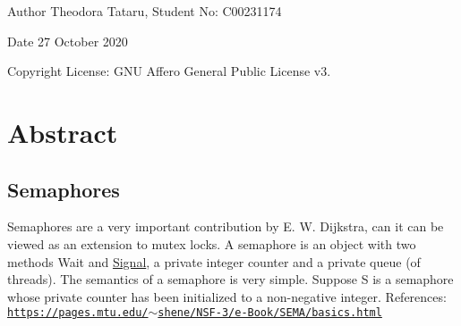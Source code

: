 \begin{DoxyAuthor}{Author}
Theodora Tataru, Student No\+: C00231174~\newline
 
\end{DoxyAuthor}
\begin{DoxyDate}{Date}
27 October 2020 
\end{DoxyDate}
\begin{DoxyCopyright}{Copyright}
License\+: G\+NU Affero General Public License v3. 
\end{DoxyCopyright}
\hypertarget{index_Abstract}{}\section{Abstract}\label{index_Abstract}
\hypertarget{index_Semaphores}{}\subsection{Semaphores}\label{index_Semaphores}
Semaphores are a very important contribution by E. W. Dijkstra, can it can be viewed as an extension to mutex locks. A semaphore is an object with two methods Wait and \hyperlink{class_signal}{Signal}, a private integer counter and a private queue (of threads). The semantics of a semaphore is very simple. Suppose S is a semaphore whose private counter has been initialized to a non-\/negative integer. References\+: \href{https://pages.mtu.edu/~shene/NSF-3/e-Book/SEMA/basics.html}{\tt https\+://pages.\+mtu.\+edu/$\sim$shene/\+N\+S\+F-\/3/e-\/\+Book/\+S\+E\+M\+A/basics.\+html} 